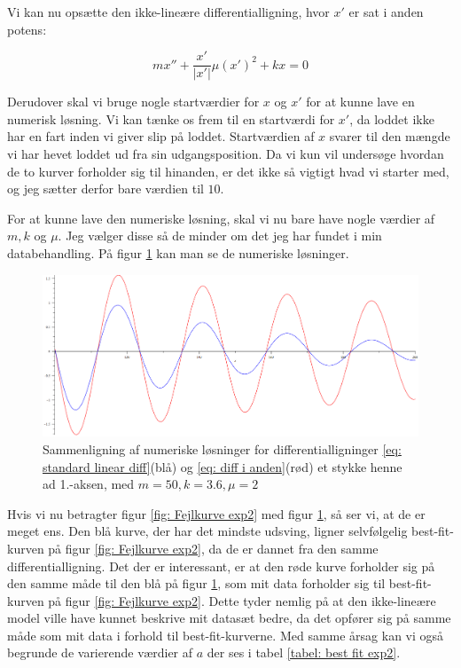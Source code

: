 Vi kan nu opsætte den ikke-lineære differentialligning, hvor $x'$ er sat i anden potens:

\begin{equation}
mx'' + \frac{x'}{|x'|} \mu  (x')^2 + kx = 0
\label{eq: diff i anden}
\end{equation}

Derudover skal vi bruge nogle startværdier for $x$ og $x'$ for at kunne lave en numerisk løsning.
Vi kan tænke os frem til en startværdi for $x'$, da loddet ikke har en fart inden vi giver slip på loddet. 
Startværdien af $x$ svarer til den mængde vi har hevet loddet ud fra sin udgangsposition. 
Da vi kun vil undersøge hvordan de to kurver forholder sig til hinanden, er det ikke så vigtigt hvad vi starter med, og jeg sætter derfor bare værdien til $10$.

For at kunne lave den numeriske løsning, skal vi nu bare have nogle værdier af $m,k$ og $\mu$. 
Jeg vælger disse så de minder om det jeg har fundet i min databehandling. 
På figur \ref{fig: numeriske solutions} kan man se de numeriske løsninger. 

\begin{figure}[h]
\centering
\includegraphics[scale=0.45]{Figurer/diffligninger}
\caption{Sammenligning af numeriske løsninger for differentialligninger \ref{eq: standard linear diff}(blå) og \ref{eq: diff i anden}(rød) et stykke henne ad 1.-aksen, med $m=50,k=3.6,\mu=2$}
\label{fig: numeriske solutions}

\end{figure}

Hvis vi nu betragter figur \ref{fig: Fejlkurve exp2} med figur \ref{fig: numeriske solutions}, så ser vi, at de er meget ens. 
Den blå kurve, der har det mindste udsving, ligner selvfølgelig best-fit-kurven på figur \ref{fig: Fejlkurve exp2}, da de er dannet fra den samme differentialligning. 
Det der er interessant, er at den røde kurve forholder sig på den samme måde til den blå på figur \ref{fig: numeriske solutions}, som mit data forholder sig til best-fit-kurven på figur \ref{fig: Fejlkurve exp2}. 
Dette tyder nemlig på at den ikke-lineære model ville have kunnet beskrive mit datasæt bedre, da det opfører sig på samme måde som mit data i forhold til best-fit-kurverne. 
Med samme årsag kan vi også begrunde de varierende værdier af $a$ der ses i tabel \ref{tabel: best fit exp2}.





